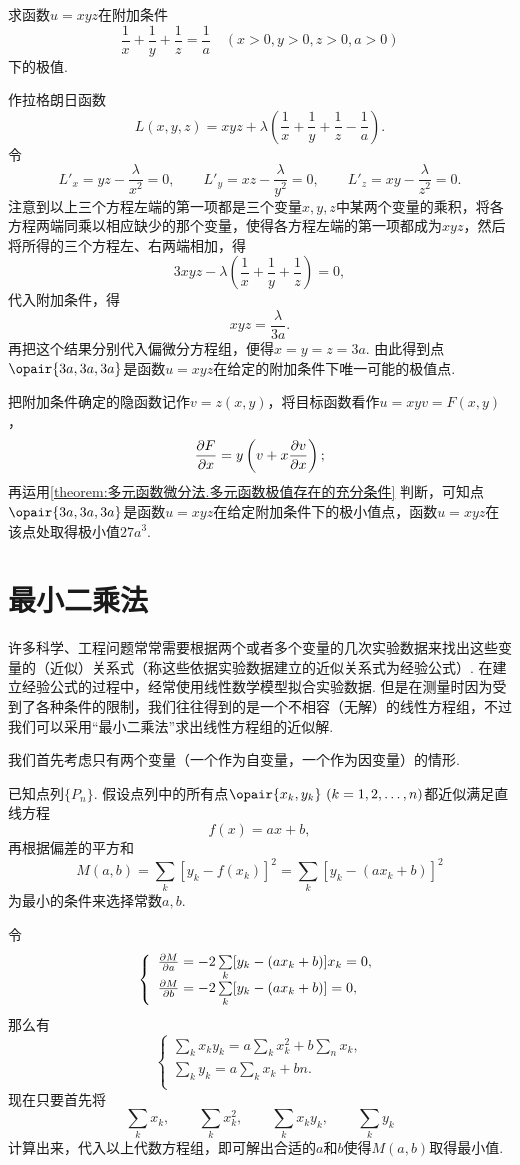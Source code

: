 \begin{example}
求函数\(u=xyz\)在附加条件\[
\frac{1}{x}+\frac{1}{y}+\frac{1}{z}=\frac{1}{a}
\quad(x>0,y>0,z>0,a>0)
\]下的极值.
\begin{solution}
作拉格朗日函数\[
L(x,y,z) = xyz+\lambda\left(\frac{1}{x}+\frac{1}{y}+\frac{1}{z}-\frac{1}{a}\right).
\]令\[
L'_x = yz - \frac{\lambda}{x^2} = 0,
\qquad
L'_y = xz - \frac{\lambda}{y^2} = 0,
\qquad
L'_z = xy - \frac{\lambda}{z^2} = 0.
\]注意到以上三个方程左端的第一项都是三个变量\(x,y,z\)中某两个变量的乘积，将各方程两端同乘以相应缺少的那个变量，使得各方程左端的第一项都成为\(xyz\)，然后将所得的三个方程左、右两端相加，得\[
3xyz - \lambda\left(\frac{1}{x}+\frac{1}{y}+\frac{1}{z}\right) = 0,
\]代入附加条件，得\[
xyz = \frac{\lambda}{3a}.
\]再把这个结果分别代入偏微分方程组，便得\(x = y = z = 3a\).
由此得到点\(\opair{3a,3a,3a}\)是函数\(u = xyz\)在给定的附加条件下唯一可能的极值点.

把附加条件确定的隐函数记作\(v = z(x,y)\)，将目标函数看作\(u = xyv = F(x,y)\)，\[
\pdv{F}{x} = y\left(v+x\pdv{v}{x}\right);
\]再运用\cref{theorem:多元函数微分法.多元函数极值存在的充分条件} 判断，可知点\(\opair{3a,3a,3a}\)是函数\(u = xyz\)在给定附加条件下的极小值点，函数\(u = xyz\)在该点处取得极小值\(27a^3\).
\end{solution}
\end{example}

\section{最小二乘法}
许多科学、工程问题常常需要根据两个或者多个变量的几次实验数据来找出这些变量的（近似）关系式（称这些依据实验数据建立的近似关系式为经验公式）.
在建立经验公式的过程中，经常使用线性数学模型拟合实验数据.
但是在测量时因为受到了各种条件的限制，我们往往得到的是一个不相容（无解）的线性方程组，不过我们可以采用“最小二乘法”求出线性方程组的近似解.

我们首先考虑只有两个变量（一个作为自变量，一个作为因变量）的情形.

已知点列\(\{P_n\}\).
假设点列中的所有点\(\opair{x_k,y_k}\ (k=1,2,\dotsc,n)\)都近似满足直线方程\[
f(x) = a x + b,
\]再根据偏差的平方和\[
M(a,b) = \sum\limits_k [y_k - f(x_k)]^2 = \sum\limits_k [y_k - (a x_k + b)]^2
\]为最小的条件来选择常数\(a,b\).

令\[
\left\{ \begin{array}{l}
\pdv{M}{a} = -2 \sum\limits_k [y_k - (a x_k + b)] x_k = 0, \\
\pdv{M}{b} = -2 \sum\limits_k [y_k - (a x_k + b)] = 0, \\
\end{array} \right.
\]那么有\[
\left\{ \begin{array}{l}
\sum\limits_k x_k y_k = a \sum\limits_k x_k^2 + b \sum\limits_n x_k, \\
\sum\limits_k y_k = a \sum\limits_k x_k + b n. \\
\end{array} \right.
\]现在只要首先将\[
\sum\limits_k x_k, \qquad
\sum\limits_k x_k^2, \qquad
\sum\limits_k x_k y_k, \qquad
\sum\limits_k y_k
\]计算出来，代入以上代数方程组，即可解出合适的\(a\)和\(b\)使得\(M(a,b)\)取得最小值.

